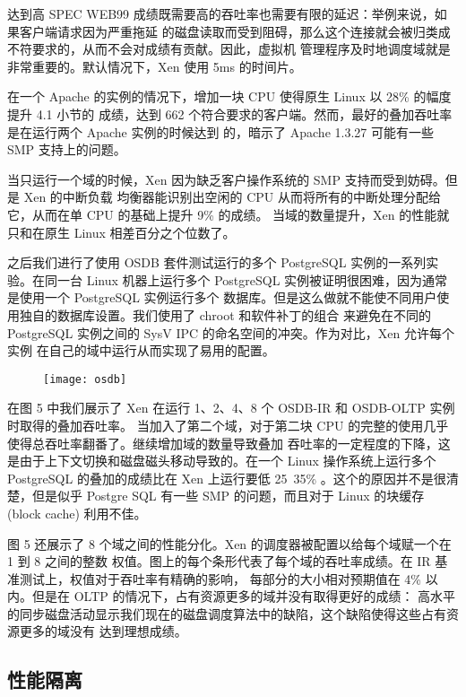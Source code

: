 达到高 SPEC WEB99 成绩既需要高的吞吐率也需要有限的延迟：举例来说，如果客户端请求因为严重拖延
的磁盘读取而受到阻碍，那么这个连接就会被归类成不符要求的，从而不会对成绩有贡献。因此，虚拟机
管理程序及时地调度域就是非常重要的。默认情况下，Xen 使用 5ms 的时间片。

在一个 Apache 的实例的情况下，增加一块 CPU 使得原生 Linux 以 28\% 的幅度提升 4.1 小节的
成绩，达到 662 个符合要求的客户端。然而，最好的叠加吞吐率是在运行两个 Apache 实例的时候达到
的，暗示了 Apache 1.3.27 可能有一些 SMP 支持上的问题。

当只运行一个域的时候，Xen 因为缺乏客户操作系统的 SMP 支持而受到妨碍。但是 Xen 的中断负载
均衡器能识别出空闲的 CPU 从而将所有的中断处理分配给它，从而在单 CPU 的基础上提升 9\% 的成绩。
当域的数量提升，Xen 的性能就只和在原生 Linux 相差百分之个位数了。

之后我们进行了使用 OSDB 套件测试运行的多个 PostgreSQL 实例的一系列实验。在同一台 Linux
机器上运行多个 PostgreSQL 实例被证明很困难，因为通常是使用一个 PostgreSQL 实例运行多个
数据库。但是这么做就不能使不同用户使用独自的数据库设置。我们使用了 chroot 和软件补丁的组合
来避免在不同的 PostgreSQL 实例之间的 SysV IPC 的命名空间的冲突。作为对比，Xen 允许每个实例
在自己的域中运行从而实现了易用的配置。

\begin{figure}[h]
    \centering
    \texttt{[image: osdb]}
\end{figure}

在图 5 中我们展示了 Xen 在运行 1、2、4、8 个 OSDB-IR 和 OSDB-OLTP 实例时取得的叠加吞吐率。
当加入了第二个域，对于第二块 CPU 的完整的使用几乎使得总吞吐率翻番了。继续增加域的数量导致叠加
吞吐率的一定程度的下降，这是由于上下文切换和磁盘磁头移动导致的。在一个 Linux 操作系统上运行多个
PostgreSQL 的叠加的成绩比在 Xen 上运行要低 25~35\% 。这个的原因并不是很清楚，但是似乎
Postgre SQL 有一些 SMP 的问题，而且对于 Linux 的块缓存 (block cache) 利用不佳。

图 5 还展示了 8 个域之间的性能分化。Xen 的调度器被配置以给每个域赋一个在 1 到 8 之间的整数
权值。图上的每个条形代表了每个域的吞吐率成绩。在 IR 基准测试上，权值对于吞吐率有精确的影响，
每部分的大小相对预期值在 4\% 以内。但是在 OLTP 的情况下，占有资源更多的域并没有取得更好的成绩：
高水平的同步磁盘活动显示我们现在的磁盘调度算法中的缺陷，这个缺陷使得这些占有资源更多的域没有
达到理想成绩。

\subsection{性能隔离}

